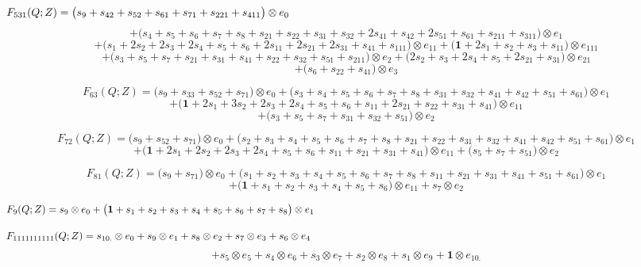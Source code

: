 \documentclass[12pt]{amsart}
\theoremstyle{plain}
\theoremstyle{definition}
\theoremstyle{remark}
\begin{document}
$$F_{ 531 }(Q;Z)=
\big( s_{9} + s_{42} + s_{52} + s_{61} + s_{71} + s_{221} + s_{411} \big) \otimes e_{ 0 }  \hskip 5in \  $$ $$
+\big( s_{4} + s_{5} + s_{6} + s_{7} + s_{8} + s_{21} + s_{22} + s_{31} + s_{32} + 2 s_{41} + s_{42} + 2 s_{51} + s_{61} + s_{211} + s_{311} \big) \otimes e_{ 1 } $$ $$
+\big( s_{1} + 2 s_{2} + 2 s_{3} + 2 s_{4} + s_{5} + s_{6} + 2 s_{11} + 2 s_{21} + 2 s_{31} + s_{41} + s_{111} \big) \otimes e_{ 11 }
+\big( \boldsymbol{1} + 2 s_{1} + s_{2} + s_{3} + s_{11} \big) \otimes e_{ 111 } $$ $$
+\big( s_{3} + s_{5} + s_{7} + s_{21} + s_{31} + s_{41} + s_{22} + s_{32} + s_{51} + s_{211} \big) \otimes e_{ 2 }
+\big( 2 s_{2} + s_{3} + 2 s_{4} + s_{5} + 2 s_{21} + s_{31} \big) \otimes e_{ 21 } $$ $$
+\big( s_{6} + s_{22} + s_{41} \big) \otimes e_{ 3 }
$$

\vfill\eject
$$F_{ 63 }(Q;Z)=
\big( s_{9} + s_{33} + s_{52} + s_{71} \big) \otimes e_{ 0 }
+\big( s_{3} + s_{4} + s_{5} + s_{6} + s_{7} + s_{8} + s_{31} + s_{32} + s_{41} + s_{42} + s_{51} + s_{61} \big) \otimes e_{ 1 } $$ $$
+\big( \boldsymbol{1} + 2 s_{1} + 3 s_{2} + 2 s_{3} + 2 s_{4} + s_{5} + s_{6} + s_{11} + 2 s_{21} + s_{22} + s_{31} + s_{41} \big) \otimes e_{ 11 } $$ $$
+\big( s_{3} + s_{5} + s_{7} + s_{31} + s_{32} + s_{51} \big) \otimes e_{ 2 }
$$

$$F_{ 72 }(Q;Z)=
\big( s_{9} + s_{52} + s_{71} \big) \otimes e_{ 0 }
+\big( s_{2} + s_{3} + s_{4} + s_{5} + s_{6} + s_{7} + s_{8} + s_{21} + s_{22} + s_{31} + s_{32} + s_{41} + s_{42} + s_{51} + s_{61} \big) \otimes e_{ 1 } $$ $$
+\big( \boldsymbol{1} + 2 s_{1} + 2 s_{2} + 2 s_{3} + 2 s_{4} + s_{5} + s_{6} + s_{11} + s_{21} + s_{31} + s_{41} \big) \otimes e_{ 11 }
+\big( s_{5} + s_{7} + s_{51} \big) \otimes e_{ 2 }
$$

$$F_{ 81 }(Q;Z)=
\big( s_{9} + s_{71} \big) \otimes e_{ 0 }
+\big( s_{1} + s_{2} + s_{3} + s_{4} + s_{5} + s_{6} + s_{7} + s_{8} + s_{11} + s_{21} + s_{31} + s_{41} + s_{51} + s_{61} \big) \otimes e_{ 1 } $$ $$
+\big( \boldsymbol{1} + s_{1} + s_{2} + s_{3} + s_{4} + s_{5} + s_{6} \big) \otimes e_{ 11 }
+ s_{7} \otimes e_{ 2 }
$$

$$F_{ 9 }(Q;Z)=
s_{9} \otimes e_{ 0 }
+\big( \boldsymbol{1} + s_{1} + s_{2} + s_{3} + s_{4} + s_{5} + s_{6} + s_{7} + s_{8} \big) \otimes e_{ 1 }
\hskip 5in \   $$

$$F_{ 1111111111 }(Q;Z)=
s_{10.} \otimes e_{ 0 }
+ s_{9} \otimes e_{ 1 }
+ s_{8} \otimes e_{ 2 }
+ s_{7} \otimes e_{ 3 }
+ s_{6} \otimes e_{ 4 }\hskip 5in \  $$ $$
+ s_{5} \otimes e_{ 5 }
+ s_{4} \otimes e_{ 6 }
+ s_{3} \otimes e_{ 7 }
+ s_{2} \otimes e_{ 8 }
+ s_{1} \otimes e_{ 9 }
+ \boldsymbol{1} \otimes e_{ 10. }
$$
\end{document}
